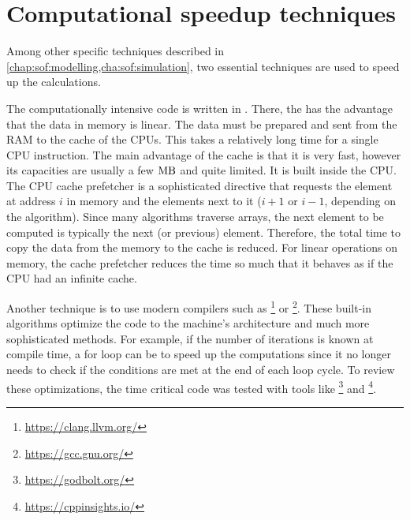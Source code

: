\section{Computational speedup techniques}\label{sec:theorySpeedup}
%
Among other specific techniques described in \cref{chap:sof:modelling,cha:sof:simulation}, two essential techniques are used to speed up the calculations. 
\par
%
The computationally intensive code is written in \cpp{}.
There, the  has the advantage that the data in memory is linear.
The data must be prepared and sent from the \ac{RAM} to the cache of the \acp{CPU}.
This takes  a relatively long time for a single \ac{CPU} instruction.
The main advantage of the cache is that it is very fast, however its capacities are usually a few $\si{\mega\byte}$ and quite limited.
It is built inside the \ac{CPU}.
The \ac{CPU} cache prefetcher is a sophisticated directive that requests the element at address $i$ in memory and the elements next to it ($i+1$ or $i-1$, depending on the algorithm).
Since many algorithms traverse arrays, the next element to be computed is typically the next (or previous) element.
Therefore, the total time to copy the data from the memory to the cache is reduced.
For linear operations on memory, the cache prefetcher reduces the time so much that it behaves as if the \ac{CPU} had an infinite cache.
\par
%
Another technique is to use modern compilers such as \footnote{\url{https://clang.llvm.org/}} or \footnote{\url{https://gcc.gnu.org/}}.
These built-in algorithms optimize the code to the machine's architecture and much more sophisticated methods.
For example, if the number of iterations is known at compile time, a for loop can be  to speed up the computations since it no longer needs to check if the conditions  are met at the end of each loop cycle.
To review these optimizations, the time critical code was tested with tools like \footnote{\url{https://godbolt.org/}} and \footnote{\url{https://cppinsights.io/}}.
%
% 
% 

